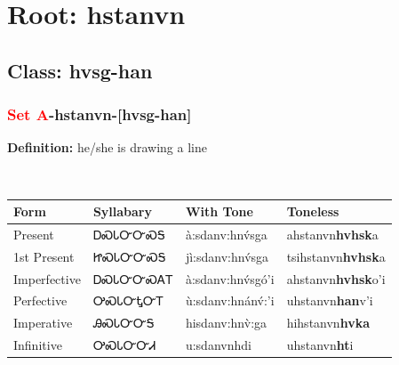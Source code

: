 \needspace{4in}
\section*{Root: hstanvn}
\nopagebreak
{}
\needspace{3in}
\subsection*{Class: hvsg-han}
\nopagebreak
\needspace{2in}
\subsubsection*{\textcolor{Red}{Set A}{-}\textbf{hstanvn}{-}[hvsg-han]}
\nopagebreak
\textbf{Definition: } he/she is drawing a line
\\[0.5em]
\begin{tabularx}{\textwidth}{l X X X}%
\toprule%
\textbf{Form}&\textbf{Syllabary}&\textbf{With Tone}&\textbf{Toneless}\\%
\midrule%
Present&ᎠᏍᏓᏅᏅᏍᎦ&à:sdanv:hnv́sga&ahstanvn\textbf{hvhsk}a\\%
1st Present&ᏥᏍᏓᏅᏅᏍᎦ&jì:sdanv:hnv́sga&tsihstanvn\textbf{hvhsk}a\\%
Imperfective&ᎠᏍᏓᏅᏅᏍᎪᎢ&à:sdanv:hnv́sgó’i&ahstanvn\textbf{hvhsk}o'i\\%
Perfective&ᎤᏍᏓᏅᎿᏅᎢ&ù:sdanv:hnánv́:’i&uhstanvn\textbf{han}v'i\\%
Imperative&ᎯᏍᏓᏅᏅᎦ&hisdanv:hnv̀:ga&hihstanvn\textbf{hvka}\\%
Infinitive&ᎤᏍᏓᏅᏅᏗ&u:sdanvnhdi&uhstanvn\textbf{ht}i\\%
\bottomrule%
\end{tabularx}
\\[1em]